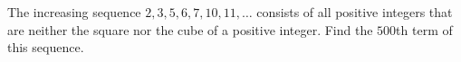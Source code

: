 The increasing sequence $2,3,5,6,7,10,11,\ldots$ consists of all positive integers that are neither the square nor the cube of a positive integer. Find the $500$th term of this sequence.
